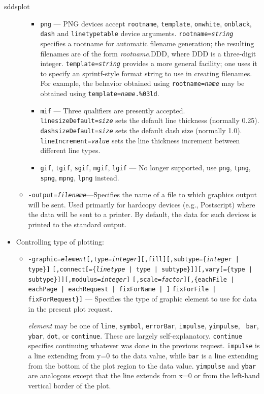 \begin{sddsprog}{sddsplot}
\begin{itemize}
\begin{itemize}
\begin{itemize}
        \item {\tt png} --- PNG devices accept {\tt rootname}, {\tt template}, {\tt onwhite}, {\tt onblack}, 
        {\tt dash} and {\tt linetypetable}  device arguments. {\tt rootname={\em string}} specifies a rootname
        for automatic filename generation; the resulting filenames are of the form {\em rootname}.DDD, where DDD 
        is a three-digit integer. {\tt template={\em string}} provides a more general facility; one uses it to
        specify an sprintf-style format string to use in creating filenames. For example, the behavior obtained
        using {\tt rootname={\em name}} may be obtained  using {\tt template={\em name}.\%03ld}.
        \item {\tt mif} --- Three qualifiers are presently accepted.  {\tt linesizeDefault={\em size}} sets the
        default line thickness (normally 0.25).  {\tt dashsizeDefault={\em size}} sets the default dash size
        (normally 1.0).  {\tt lineIncrement={\em value}} sets the line thickness increment between different
        line types.
        \item {\tt gif}, {\tt tgif}, {\tt sgif}, {\tt mgif}, {\tt lgif} --- No longer supported, use {\tt png}, 
        {\tt tpng}, {\tt spng}, {\tt mpng}, {\tt lpng} instead.
        \end{itemize}
  \item {\tt -output={\em filename}}---Specifies the name of a file to which graphics output will be sent.
        Used primarily for hardcopy devices (e.g., Postscript) where the data will be sent to a printer.
        By default, the data for such devices is printed to the standard output.
  \end{itemize}
\item Controlling type of plotting:
  \begin{itemize}

  \item {\tt -graphic={\em element}[,type={\em integer}][,fill][,subtype=\{{\em integer} | type\}]}
        {\tt [,connect[=\{{\em linetype} | type | subtype\}]][,vary[=\{type | subtype\}]][,modulus={\em integer}]}
        {\tt [,scale={\em factor}][,\{eachFile | eachPage | eachRequest | fixForName | ]}
  {\tt fixForFile | fixForRequest\}]} ---
        Specifies the type of graphic element to use for data in the present plot request.  

{\em element} may be one of {\tt line}, {\tt symbol}, {\tt errorBar}, {\tt impulse}, {\tt yimpulse}, {\tt
bar}, {\tt ybar}, {\tt dot}, or {\tt continue}.  These are largely self-explanatory.  {\tt continue}
specifies continuing whatever was done in the previous request.  {\tt impulse} is a line extending from
y=0 to the data value, while {\tt bar} is a line extending from the bottom of the plot region to the data
value.  {\tt yimpulse} and {\tt ybar} are analogous except that the line extends from x=0 or from the
left-hand vertical border of the plot.


\end{itemize}
\end{itemize}
\end{sddsprog}
